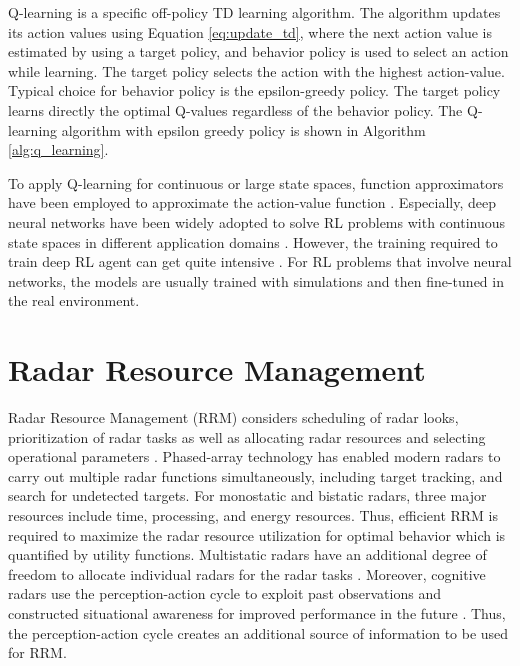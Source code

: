 \documentclass[english, 12pt, a4paper, elec, utf8, a-1b, online]{aaltothesis}
\begin{document}
Q-learning is a specific off-policy TD learning algorithm. 
The algorithm updates its action values using Equation \eqref{eq:update_td}, where the next action value is estimated by using a target policy, 
and behavior policy is used to select an action while learning. 
The target policy selects the action with the highest action-value.
Typical choice for behavior policy is the epsilon-greedy policy. 
The target policy learns directly the optimal Q-values regardless of the behavior policy. 
The Q-learning algorithm with epsilon greedy policy is shown in Algorithm \ref{alg:q_learning}.

To apply Q-learning for continuous or large state spaces, function approximators have been employed to approximate the action-value function \cite{Sutton2018}. 
Especially, deep neural networks have been widely adopted to solve RL problems with continuous state spaces in different application domains \cite{Mnih2013, Zhang2018, Luong2018}.
However, the training required to train deep RL agent can get quite intensive \cite{Irpan2018}.
For RL problems that involve neural networks, the models are usually trained with simulations and then fine-tuned in the real environment.


\clearpage
\section{Radar Resource Management} \label{sec:existing_RRM}



Radar Resource Management (RRM) considers scheduling of radar looks, prioritization of radar tasks as well as allocating radar resources and selecting operational parameters \cite{Moo2016}. 
Phased-array technology has enabled modern radars to carry out multiple radar functions simultaneously, including target tracking, and search for undetected targets. 
For monostatic and bistatic radars, three major resources include time, processing, and energy resources. 
Thus, efficient RRM is required to maximize the radar resource utilization for optimal behavior which is quantified by utility functions. 
Multistatic radars have an additional degree of freedom to allocate individual radars for the radar tasks \cite{Moo2016}. 
Moreover, cognitive radars use the perception-action cycle to exploit past observations and constructed situational awareness for improved performance in the future \cite{Haykin2006}. 
Thus, the perception-action cycle creates an additional source of information to be used for RRM.
\end{document}
